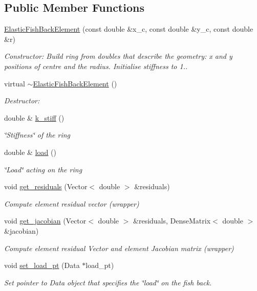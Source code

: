 \subsection*{Public Member Functions}
\begin{DoxyCompactItemize}
\item 
\hyperlink{classElasticFishBackElement_a0411850f03db9f6eeb10562be778dacb}{Elastic\+Fish\+Back\+Element} (const double \&x\+\_\+c, const double \&y\+\_\+c, const double \&r)
\begin{DoxyCompactList}\small\item\em Constructor\+: Build ring from doubles that describe the geometry\+: x and y positions of centre and the radius. Initialise stiffness to 1.. \end{DoxyCompactList}\item 
virtual \hyperlink{classElasticFishBackElement_a3889028a8375ef126ec207f73ca18adc}{$\sim$\+Elastic\+Fish\+Back\+Element} ()
\begin{DoxyCompactList}\small\item\em Destructor\+: \end{DoxyCompactList}\item 
double \& \hyperlink{classElasticFishBackElement_af0e376da1420c97403549b3a48f8b356}{k\+\_\+stiff} ()
\begin{DoxyCompactList}\small\item\em \char`\"{}\+Stiffness\char`\"{} of the ring \end{DoxyCompactList}\item 
double \& \hyperlink{classElasticFishBackElement_afe29dde5bd5ff5763bcb1ded94adf826}{load} ()
\begin{DoxyCompactList}\small\item\em \char`\"{}\+Load\char`\"{} acting on the ring \end{DoxyCompactList}\item 
void \hyperlink{classElasticFishBackElement_aed5858c2ae86823017713d0894cc4052}{get\+\_\+residuals} (Vector$<$ double $>$ \&residuals)
\begin{DoxyCompactList}\small\item\em Compute element residual vector (wrapper) \end{DoxyCompactList}\item 
void \hyperlink{classElasticFishBackElement_a48729984910b86d7210ed218bcb821bd}{get\+\_\+jacobian} (Vector$<$ double $>$ \&residuals, Dense\+Matrix$<$ double $>$ \&jacobian)
\begin{DoxyCompactList}\small\item\em Compute element residual Vector and element Jacobian matrix (wrapper) \end{DoxyCompactList}\item 
void \hyperlink{classElasticFishBackElement_a14397b102dbefc87a7e8f6a6782ec730}{set\+\_\+load\+\_\+pt} (Data $\ast$load\+\_\+pt)
\begin{DoxyCompactList}\small\item\em Set pointer to Data object that specifies the \char`\"{}load\char`\"{} on the fish back. \end{DoxyCompactList}\end{DoxyCompactItemize}
